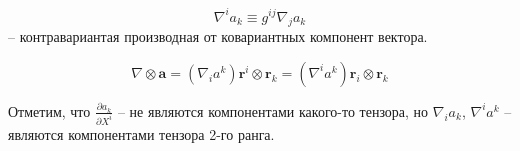 \begin{enumerate}
\begin{itemize}
        \[
          \nabla^i a_k \equiv g^{ij} \nabla_j a_k
        \]
        -- контравариантая производная от ковариантных компонент вектора.

\[
          \nabla \otimes \mathbf{a}
          = (\nabla_i a^k) \mathbf{r}^i \otimes \mathbf{r}_k
          = (\nabla^i a^k) \mathbf{r}_i \otimes \mathbf{r}_k
        \]

        Отметим, что $ \frac{\partial a_k}{\partial X^i} $ -- не являются компонентами какого-то
        тензора, но $\nabla_i a_k$, $\nabla^i a^k$ -- являются компонентами тензора 2-го ранга.

    \end{itemize}
\end{enumerate}


